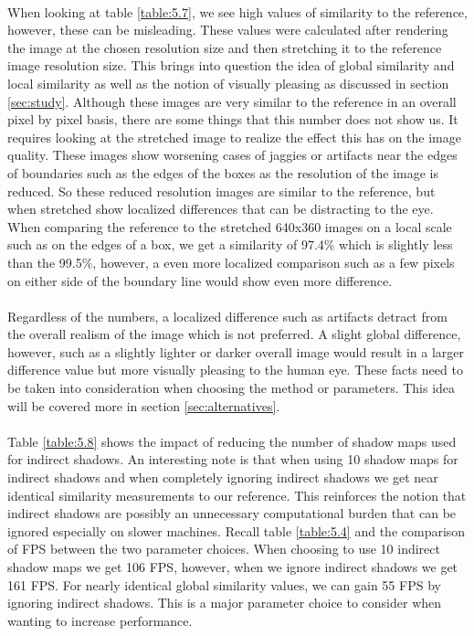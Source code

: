 \paragraph{}
When looking at table \ref{table:5.7}, we see high values of similarity to the reference, however, these can be misleading.  These values were calculated after rendering the image at the chosen resolution size and then stretching it to the reference image resolution size.  This brings into question the idea of global similarity and local similarity as well as the notion of visually pleasing as discussed in section \ref{sec:study}.  Although these images are very similar to the reference in an overall pixel by pixel basis, there are some things that this number does not show us.  It requires looking at the stretched image to realize the effect this has on the image quality.  These images show worsening cases of jaggies or artifacts near the edges of boundaries such as the edges of the boxes as the resolution of the image is reduced.  So these reduced resolution images are similar to the reference, but when stretched show localized differences that can be distracting to the eye.  When comparing the reference to the stretched 640x360 images on a local scale such as on the edges of a box, we get a similarity of 97.4\% which is slightly less than the 99.5\%, however, a even more localized comparison such as a few pixels on either side of the boundary line would show even more difference.

\paragraph{}
Regardless of the numbers, a localized difference such as artifacts detract from the overall realism of the image which is not preferred.  A slight global difference, however, such as a slightly lighter or darker overall image would result in a larger difference value but more visually pleasing to the human eye.  These facts need to be taken into consideration when choosing the method or parameters.  This idea will be covered more in section \ref{sec:alternatives}.

\paragraph{}
Table \ref{table:5.8} shows the impact of reducing the number of shadow maps used for indirect shadows.  An interesting note is that when using 10 shadow maps for indirect shadows and when completely ignoring indirect shadows we get near identical similarity measurements to our reference.  This reinforces the notion that indirect shadows are possibly an unnecessary computational burden that can be ignored especially on slower machines.  Recall table \ref{table:5.4} and the comparison of FPS between the two parameter choices.  When choosing to use 10 indirect shadow maps we get 106 FPS, however, when we ignore indirect shadows we get 161 FPS.  For nearly identical global similarity values, we can gain 55 FPS by ignoring indirect shadows.  This is a major parameter choice to consider when wanting to increase performance.

